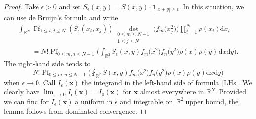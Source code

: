 \documentclass[11pt]{article}
\numberwithin{equation}{section}
\numberwithin{equation}{section}
\newcommand{\dd}{\mathrm{d}}
\begin{document}
\begin{proof} Take $\epsilon > 0$ and set $S_{\epsilon}(x,y) = S(x,y) \cdot \mathbf{1}_{|x + y| \geq \epsilon}$. In this situation, we can use de Bruijn's formula and write
\begin{gather}
\nonumber \int_{\mathbb{R}^N} \operatorname{Pf}_{1 \leq i,j \leq N} (S_{\epsilon}(x_i,x_j)) \mathop{\det}_{\substack{0 \leq m \leq N - 1 \\ 1 \leq j \leq N}} \bigl(f_m\bigl(x_j^2\bigr)\bigr) \prod_{i = 1}^N \rho(x_i)\dd x_i \\
\qquad {} = N!\operatorname{Pf}_{0 \leq m,n \leq N - 1} \biggl(\int_{\mathbb{R}^2} S_{\epsilon}(x,y)f_m\bigl(x^2\bigr)f_n\bigl(y^2\bigr)\rho(x)\rho(y)\,\dd x \dd y\biggr).\label{LHs}
\end{gather}
The right-hand side tends to
\[
N! \operatorname{Pf}_{0 \leq m,n \leq N - 1} \biggl(\fint_{\mathbb{R}^2} S(x,y) f_m\bigl(x^2\bigr)f_n\bigl(y^2\bigr)\rho(x)\rho(y)\dd x \dd y\biggr)
\]
 when ${\epsilon \rightarrow 0}$. Call $I_{\epsilon}(\mathbf{x})$ the integrand in the left-hand side of formula~\eqref{LHs}. We clearly have $\lim_{\epsilon \rightarrow 0} I_{\epsilon}(\mathbf{x}) = I_0(\mathbf{x})$ for $\mathbf{x}$ almost everywhere in $\mathbb{R}^N$. Provided we can find for $I_{\epsilon}(\mathbf{x})$ a uniform in $\epsilon$ and integrable on~$\mathbb{R}^2$ upper bound, the lemma follows from dominated convergence.


\end{proof}
\end{document}
